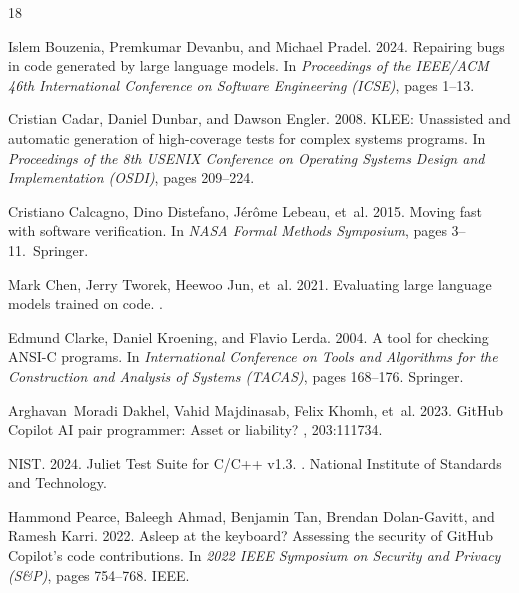\documentclass[sigconf,screen,nonacm,pbalance]{acmart}
\begin{document}
\clearpage

\renewcommand{\bibfont}{\footnotesize}
\begin{thebibliography}{18}
\footnotesize
\setlength{\itemsep}{1.5pt plus 0.5pt}
\setlength{\parsep}{0pt}

Islem Bouzenia, Premkumar Devanbu, and Michael Pradel. 2024.
\newblock Repairing bugs in code generated by large language models.
\newblock In {\em Proceedings of the IEEE/ACM 46th International Conference on Software Engineering (ICSE)}, pages 1--13.

Cristian Cadar, Daniel Dunbar, and Dawson Engler. 2008.
\newblock KLEE: Unassisted and automatic generation of high-coverage tests for complex systems programs.
\newblock In {\em Proceedings of the 8th USENIX Conference on Operating Systems Design and Implementation (OSDI)}, pages 209--224.

Cristiano Calcagno, Dino Distefano, J{\'e}r{\^o}me Lebeau, et~al. 2015.
\newblock Moving fast with software verification.
\newblock In {\em NASA Formal Methods Symposium}, pages 3--11.~Springer.

Mark Chen, Jerry Tworek, Heewoo Jun, et~al. 2021.
\newblock Evaluating large language models trained on code.
.

Edmund Clarke, Daniel Kroening, and Flavio Lerda. 2004.
\newblock A tool for checking ANSI-C programs.
\newblock In {\em International Conference on Tools and Algorithms for the Construction and Analysis of Systems (TACAS)}, pages 168--176. Springer.

Arghavan~Moradi Dakhel, Vahid Majdinasab, Felix Khomh, et~al. 2023.
\newblock GitHub Copilot AI pair programmer: Asset or liability?
, 203:111734.

NIST. 2024.
\newblock Juliet Test Suite for C/C++ v1.3.
. National Institute of Standards and Technology.

Hammond Pearce, Baleegh Ahmad, Benjamin Tan, Brendan Dolan-Gavitt, and Ramesh Karri. 2022.
\newblock Asleep at the keyboard? Assessing the security of GitHub Copilot's code contributions.
\newblock In {\em 2022 IEEE Symposium on Security and Privacy (S\&P)}, pages 754--768. IEEE.


\end{thebibliography}
\end{document}
